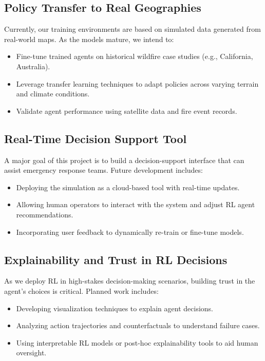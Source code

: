 \documentclass[conference]{IEEEtran}
\begin{document}
\subsection{Policy Transfer to Real Geographies}
Currently, our training environments are based on simulated data generated from real-world maps. As the models mature, we intend to:

\begin{itemize}
    \item Fine-tune trained agents on historical wildfire case studies (e.g., California, Australia).
    \item Leverage transfer learning techniques to adapt policies across varying terrain and climate conditions.
    \item Validate agent performance using satellite data and fire event records.
\end{itemize}

\subsection{Real-Time Decision Support Tool}
A major goal of this project is to build a decision-support interface that can assist emergency response teams. Future development includes:

\begin{itemize}
    \item Deploying the simulation as a cloud-based tool with real-time updates.
    \item Allowing human operators to interact with the system and adjust RL agent recommendations.
    \item Incorporating user feedback to dynamically re-train or fine-tune models.
\end{itemize}

\subsection{Explainability and Trust in RL Decisions}
As we deploy RL in high-stakes decision-making scenarios, building trust in the agent’s choices is critical. Planned work includes:

\begin{itemize}
    \item Developing visualization techniques to explain agent decisions.
    \item Analyzing action trajectories and counterfactuals to understand failure cases.
    \item Using interpretable RL models or post-hoc explainability tools to aid human oversight.
\end{itemize}
\end{document}
